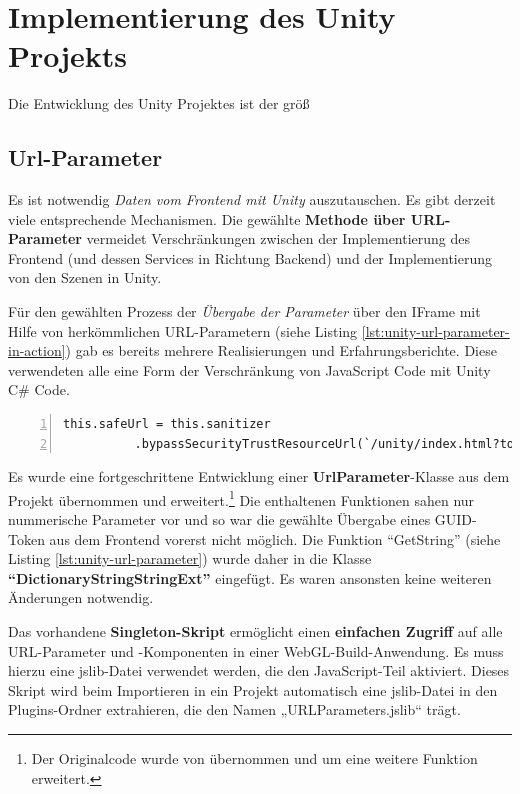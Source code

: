 \section{Implementierung des Unity Projekts}

Die Entwicklung des Unity Projektes ist der grö\ss{}




\subsection{Url-Parameter}
\label{subsec:unity-url-parameter}

Es ist notwendig \emph{Daten vom Frontend mit Unity} auszutauschen. Es gibt derzeit viele entsprechende Mechanismen. Die gewählte \textbf{Methode über URL-Parameter} vermeidet Verschränkungen zwischen der Implementierung des Frontend (und dessen Services in Richtung Backend) und der Implementierung von den Szenen in Unity.


Für den gewählten Prozess der \emph{Übergabe der Parameter} über den IFrame mit Hilfe von herkömmlichen URL-Parametern (siehe Listing \ref{lst:unity-url-parameter-in-action}) gab es bereits mehrere Realisierungen und Erfahrungsberichte. Diese verwendeten alle eine Form der Verschränkung von JavaScript Code mit Unity C\# Code. 



\begin{lstlisting}[numbers=left,caption={IFrame for Unity in Frontend},label={lst:unity-url-parameter-in-action}]
this.safeUrl = this.sanitizer
          .bypassSecurityTrustResourceUrl(`/unity/index.html?token=${myToken}& server=${environment.apiConfig.uri}`);
\end{lstlisting}


Es wurde eine fortgeschrittene Entwicklung einer \textbf{UrlParameter}-Klasse aus dem Projekt übernommen und erweitert.\footnote{Der Originalcode wurde von \cite{UrlParameter} übernommen und um eine weitere Funktion erweitert.} Die enthaltenen Funktionen sahen nur nummerische Parameter vor und so war die gewählte Übergabe eines GUID-Token aus dem Frontend vorerst nicht möglich. Die Funktion ``GetString'' (siehe Listing \ref{lst:unity-url-parameter}) wurde daher in die Klasse \textbf{``DictionaryStringStringExt''} eingefügt. Es waren ansonsten keine weiteren Änderungen notwendig.

Das vorhandene \textbf{Singleton-Skript} ermöglicht einen \textbf{einfachen Zugriff} auf alle URL-Parameter und -Komponenten in einer WebGL-Build-Anwendung. Es muss hierzu eine jslib-Datei verwendet werden, die den JavaScript-Teil aktiviert. Dieses Skript wird beim Importieren in ein Projekt automatisch eine jslib-Datei in den Plugins-Ordner extrahieren, die den Namen „URLParameters.jslib“ trägt.

